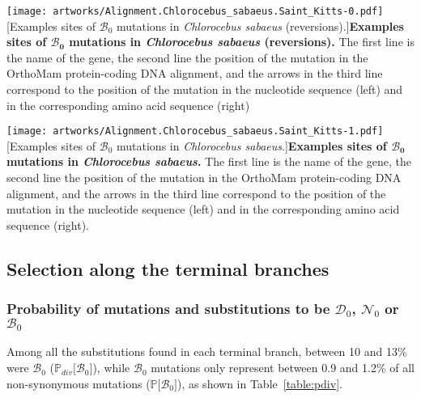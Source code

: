 \documentclass{article}
\newcommand{\proba}{\mathbb{P}}
\newcommand{\SphyDel}{\mathcal{D}_0}
\newcommand{\SphyNeu}{\mathcal{N}_0}
\newcommand{\SphyBen}{\mathcal{B}_0}
\begin{document}
    \newpage
    \begin{center}
        \texttt{[image: artworks/Alignment.Chlorocebus\_sabaeus.Saint\_Kitts-0.pdf]}
        [Examples sites of $\SphyBen$ mutations in \textit{Chlorocebus sabaeus} (reversions).]{\textbf{Examples sites of $\bm{\SphyBen}$ mutations in \textit{Chlorocebus sabaeus}  (reversions).} The first line is the name of the gene, the second line the position of the mutation in the OrthoMam protein-coding DNA alignment, and the arrows in the third line correspond to the position of the mutation in the nucleotide sequence (left) and in the corresponding amino acid sequence (right)\label{fig:example-1}}
    \end{center}

    \newpage
    \begin{center}
        \texttt{[image: artworks/Alignment.Chlorocebus\_sabaeus.Saint\_Kitts-1.pdf]}
        [Examples sites of $\SphyBen$ mutations in \textit{Chlorocebus sabaeus}.]{\textbf{Examples sites of $\bm{\SphyBen}$ mutations in \textit{Chlorocebus sabaeus}.} The first line is the name of the gene, the second line the position of the mutation in the OrthoMam protein-coding DNA alignment, and the arrows in the third line correspond to the position of the mutation in the nucleotide sequence (left) and in the corresponding amino acid sequence (right).\label{fig:example-2}}
    \end{center}

    \newpage
    \subsection{Selection along the terminal branches}\label{subsec:summary-table-mutsel}

    \subsubsection{Probability of mutations and substitutions to be \texorpdfstring{$\SphyDel$}{D₀}, \texorpdfstring{$\SphyNeu$}{N₀} or \texorpdfstring{$\SphyBen$}{B₀}}
    Among all the substitutions found in each terminal branch, between 10 and 13\% were $\SphyBen$ ($\proba_{div}[ \SphyBen {]}$), while $\SphyBen$ mutations only represent between 0.9 and 1.2\% of all non-synonymous mutations ($\proba[ \SphyBen {]}$), as shown in Table~\ref{table:pdiv}.
\end{document}
